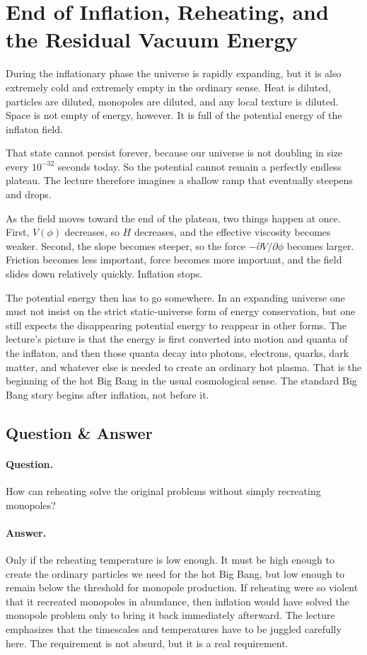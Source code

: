 \section{End of Inflation, Reheating, and the Residual Vacuum Energy}

During the inflationary phase the universe is rapidly expanding, but it is also extremely cold and extremely empty in the ordinary sense. Heat is diluted, particles are diluted, monopoles are diluted, and any local texture is diluted. Space is not empty of energy, however. It is full of the potential energy of the inflaton field.

That state cannot persist forever, because our universe is not doubling in size every \(10^{-32}\) seconds today. So the potential cannot remain a perfectly endless plateau. The lecture therefore imagines a shallow ramp that eventually steepens and drops.

As the field moves toward the end of the plateau, two things happen at once. First, \(V(\phi)\) decreases, so \(H\) decreases, and the effective viscosity becomes weaker. Second, the slope becomes steeper, so the force \(-\partial V/\partial\phi\) becomes larger. Friction becomes less important, force becomes more important, and the field slides down relatively quickly. Inflation stops.

The potential energy then has to go somewhere. In an expanding universe one must not insist on the strict static-universe form of energy conservation, but one still expects the disappearing potential energy to reappear in other forms. The lecture's picture is that the energy is first converted into motion and quanta of the inflaton, and then those quanta decay into photons, electrons, quarks, dark matter, and whatever else is needed to create an ordinary hot plasma. That is the beginning of the hot Big Bang in the usual cosmological sense. The standard Big Bang story begins after inflation, not before it.

\subsection{Question \& Answer}

\paragraph{Question.} How can reheating solve the original problems without simply recreating monopoles?

\paragraph{Answer.} Only if the reheating temperature is low enough. It must be high enough to create the ordinary particles we need for the hot Big Bang, but low enough to remain below the threshold for monopole production. If reheating were so violent that it recreated monopoles in abundance, then inflation would have solved the monopole problem only to bring it back immediately afterward. The lecture emphasizes that the timescales and temperatures have to be juggled carefully here. The requirement is not absurd, but it is a real requirement.

